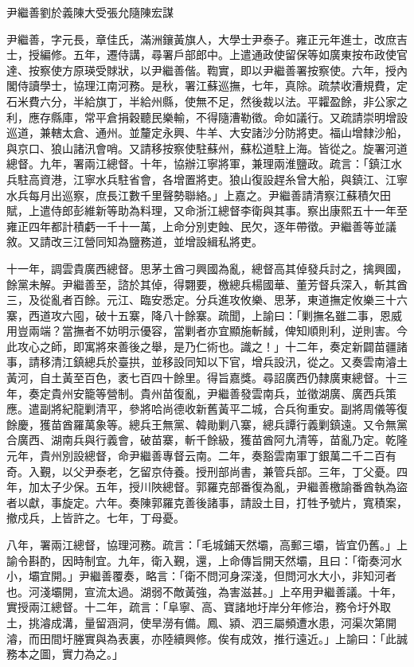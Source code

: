 
\begin{pinyinscope}
尹繼善劉於義陳大受張允隨陳宏謀

尹繼善，字元長，章佳氏，滿洲鑲黃旗人，大學士尹泰子。雍正元年進士，改庶吉士，授編修。五年，遷侍講，尋署戶部郎中。上遣通政使留保等如廣東按布政使官達、按察使方原瑛受賕狀，以尹繼善偕。鞫實，即以尹繼善署按察使。六年，授內閣侍讀學士，協理江南河務。是秋，署江蘇巡撫，七年，真除。疏禁收漕規費，定石米費六分，半給旗丁，半給州縣，使無不足，然後裁以法。平糶盈餘，非公家之利，應存縣庫，常平倉捐穀聽民樂輸，不得隨漕勒徵。命如議行。又疏請崇明增設巡道，兼轄太倉、通州。並釐定永興、牛羊、大安諸沙分防將吏。福山增隸沙船，與京口、狼山諸汛會哨。又請移按察使駐蘇州，蘇松道駐上海。皆從之。旋署河道總督。九年，署兩江總督。十年，協辦江寧將軍，兼理兩淮鹽政。疏言：「鎮江水兵駐高資港，江寧水兵駐省會，各增置將吏。狼山復設趕糸曾大船，與鎮江、江寧水兵每月出巡察，庶長江數千里聲勢聯絡。」上嘉之。尹繼善請清察江蘇積欠田賦，上遣侍郎彭維新等助為料理，又命浙江總督李衛與其事。察出康熙五十一年至雍正四年都計積虧一千十一萬，上命分別吏蝕、民欠，逐年帶徵。尹繼善等並議敘。又請改三江營同知為鹽務道，並增設緝私將吏。

十一年，調雲貴廣西總督。思茅土酋刁興國為亂，總督高其倬發兵討之，擒興國，餘黨未解。尹繼善至，諮於其倬，得翾要，檄總兵楊國華、董芳督兵深入，斬其酋三，及從亂者百餘。元江、臨安悉定。分兵進攻攸樂、思茅，東道撫定攸樂三十六寨，西道攻六囤，破十五寨，降八十餘寨。疏聞，上諭曰：「剿撫名雖二事，恩威用豈兩端？當撫者不妨明示優容，當剿者亦宜顯施斬馘，俾知順則利，逆則害。今此攻心之師，即寓將來善後之舉，是乃仁術也。識之！」十二年，奏定新闢苗疆諸事，請移清江鎮總兵於臺拱，並移設同知以下官，增兵設汛，從之。又奏雲南濬土黃河，自土黃至百色，袤七百四十餘里。得旨嘉獎。尋詔廣西仍隸廣東總督。十三年，奏定貴州安籠等營制。貴州苗復亂，尹繼善發雲南兵，並徵湖廣、廣西兵策應。遣副將紀龍剿清平，參將哈尚德收新舊黃平二城，合兵徇重安。副將周儀等復餘慶，獲苗酋羅萬象等。總兵王無黨、韓勛剿八寨，總兵譚行義剿鎮遠。又令無黨合廣西、湖南兵與行義會，破苗寨，斬千餘級，獲苗酋阿九清等，苗亂乃定。乾隆元年，貴州別設總督，命尹繼善專督云南。二年，奏豁雲南軍丁銀萬二千二百有奇。入覲，以父尹泰老，乞留京侍養。授刑部尚書，兼管兵部。三年，丁父憂。四年，加太子少保。五年，授川陜總督。郭羅克部番復為亂，尹繼善檄諭番酋執為盜者以獻，事旋定。六年。奏陳郭羅克善後諸事，請設土目，打牲予號片，寬積案，撤戍兵，上皆許之。七年，丁母憂。

八年，署兩江總督，協理河務。疏言：「毛城鋪天然壩，高郵三壩，皆宜仍舊。」上諭令斟酌，因時制宜。九年，衛入覲，還，上命傳旨開天然壩，且曰：「衛奏河水小，壩宜開。」尹繼善覆奏，略言：「衛不問河身深淺，但問河水大小，非知河者也。河淺壩開，宣流太過。湖弱不敵黃強，為害滋甚。」上卒用尹繼善議。十年，實授兩江總督。十二年，疏言：「阜寧、高、寶諸地圩岸分年修治，務令圩外取土，挑濬成溝，量留涵洞，使旱澇有備。鳳、潁、泗三屬頻遭水患，河渠次第開濬，而田間圩塍實與為表裏，亦陸續興修。俟有成效，推行遠近。」上諭曰：「此誠務本之圖，實力為之。」


\end{pinyinscope}
